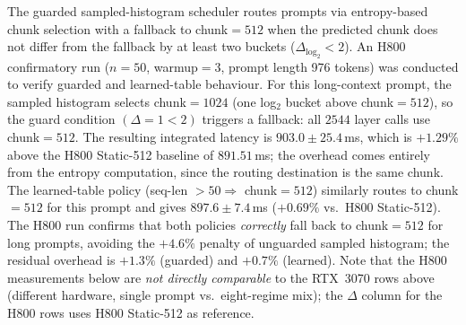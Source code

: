 The guarded sampled-histogram scheduler routes prompts via entropy-based chunk selection with a fallback to chunk$=512$ when the predicted chunk does not differ from the fallback by at least two buckets ($\Delta_{\log_2} < 2$).
An H800 confirmatory run ($n{=}50$, warmup$=3$, prompt length 976 tokens) was conducted to verify guarded and learned-table behaviour.
For this long-context prompt, the sampled histogram selects chunk$=1024$ (one log$_2$ bucket above chunk$=512$), so the guard condition $(\Delta{=}1 < 2)$ triggers a fallback: all $2544$ layer calls use chunk$=512$.
The resulting integrated latency is $903.0 \pm 25.4$\,ms, which is $+1.29\%$ above the H800 Static-512 baseline of $891.51$\,ms; the overhead comes entirely from the entropy computation, since the routing destination is the same chunk.
The learned-table policy (seq-len $> 50 \Rightarrow$ chunk$=512$) similarly routes to chunk$=512$ for this prompt and gives $897.6 \pm 7.4$\,ms ($+0.69\%$ vs.\ H800 Static-512).
The H800 run confirms that both policies \emph{correctly} fall back to chunk$=512$ for long prompts, avoiding the $+4.6\%$ penalty of unguarded sampled histogram; the residual overhead is $+1.3\%$ (guarded) and $+0.7\%$ (learned).
Note that the H800 measurements below are \emph{not directly comparable} to the RTX~3070 rows above (different hardware, single prompt vs.\ eight-regime mix); the $\Delta$ column for the H800 rows uses H800 Static-512 as reference.

